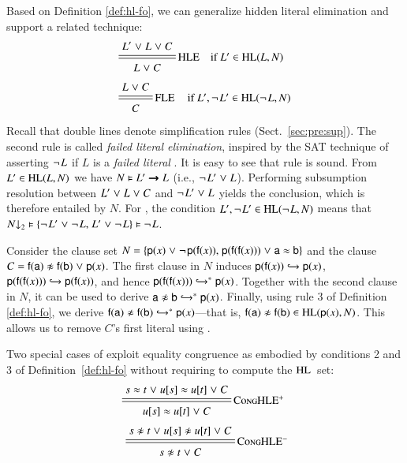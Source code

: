Based on Definition \ref{def:hl-fo}, we can generalize hidden literal elimination
and support a related technique:
\begin{align*}
    & \namedsimpsc{HLE}{L' \cor L \cor C}{L \cor C}{L' \in \HL(L,N)} \\[.5\jot]
    & \namedsimpsc{\rlap{FLE}\phantom{HLE}}{L \cor C}{C}{L',\neglit{L'} \in \HL(\neglit{L}, N)}
 \end{align*}
Recall that double lines denote simplification rules (Sect.~\ref{sec:pre:sup}).
The second rule is called \textit{failed literal elimination},
inspired by the SAT technique of asserting $\neglit{L}$ if $L$ is a \textit{failed literal} \cite{jwf-1995-fld}.
It is easy to see that rule  is sound.
From $L' \in \HL(L,N)$ we have $N \models L' \impl L$ (i.e., $\neglit{L'} \cor L$).
Performing subsumption resolution \cite{bg-01-resolution} between $L'
\cor L \cor C$ and $\neglit{L'} \cor L$ yields the conclusion, which is
therefore entailed by $N.$ For , the condition $L',
\neglit{L'} \in \HL(\neglit{L},N)$ means that $\binset{N} \models \{\neglit{L'} \cor
\neglit{L}{,}\; L' \cor \neglit{L}\} \models \neglit{L}$.


\begin{exa}
   \label{example:hle}
   Consider the clause set $N = \{ \cst{p}(x) \cor \neglit{\cst{p}(\cst{f}(x))}{,}\;
   \cst{p}(\cst{f}(\cst{f}(x))) \cor \eqlit{\cst{a}}{\cst{b}} \}$ and the clause
   $C = \neqlit{\cst{f}(\cst{a})}{\cst{f}(\cst{b})} \cor \cst{p}(x)$. The first
   clause in $N$ induces $\cst{p}(\cst{f}(x)) \bigfimpl{N} {\cst{p}(x)}$,
   $\cst{p}(\cst{f}(\cst{f}(x))) \bigfimpl{N} \cst{p}(\cst{f}(x))$, and
   hence $\cst{p}(\cst{f}(\cst{f}(x))) \bigfimpl{N}^\ast  \cst{p}(x)$.
   Together with the second clause in $N$, it can be used to derive $\neqlit{\cst{a}}{\cst{b}}
   \bigfimpl{N}^\ast  \cst{p}(x)$. Finally, using rule 3 of Definition
   \ref{def:hl-fo}, we derive $\neqlit{\cst{f}(\cst{a})}{\cst{f}(\cst{b})}
   \bigfimpl{N}^\ast  \cst{p}(x)$---that is,
   $\neqlit{\cst{f}(\cst{a})}{\cst{f}(\cst{b})} \in \HL(\cst{p}(x), N)$. This
   allows us to remove $C$'s first literal using .
\end{exa}

Two special cases of  exploit equality congruence as embodied by
conditions 2 and 3 of Definition~\ref{def:hl-fo} without requiring to
compute the $\HL$~set:
\begin{align*}
  \namedsimp{CongHLE$^+$}{\eqlit{s}{t} \cor \eqlit{u[s]}{u[t]} \cor C}{\eqlit{u[s]}{u[t]} \cor C}\,\, \\[.5\jot]
  \namedsimp{CongHLE$^-$}{\neqlit{s}{t} \cor \neqlit{u[s]}{u[t]} \cor C}{\neqlit{s}{t} \cor C}
\end{align*}%

